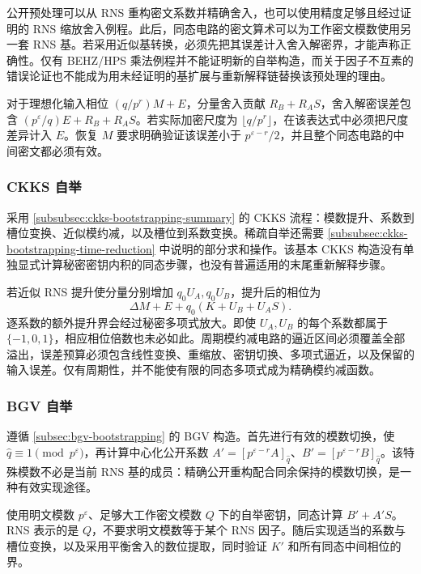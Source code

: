 公开预处理可以从 RNS 重构密文系数并精确舍入，也可以使用精度足够且经过证明的 RNS 缩放舍入例程。此后，同态电路的密文算术可以为工作密文模数使用另一套 RNS 基。若采用近似基转换，必须先把其误差计入舍入解密界，才能声称正确性。仅有 BEHZ/HPS 乘法例程并不能证明新的自举构造，而关于因子不互素的错误论证也不能成为用未经证明的基扩展与重新解释链替换该预处理的理由。

对于理想化输入相位 $(q/p^r)M+E$，分量舍入贡献 $R_B+R_AS$，舍入解密误差包含 $(p^\varepsilon/q)E+R_B+R_AS$。若实际加密尺度为 $\lfloor q/p^r\rfloor$，在该表达式中必须把尺度差异计入 $E$。恢复 $M$ 要求明确验证该误差小于 $p^{\varepsilon-r}/2$，并且整个同态电路的中间密文都必须有效。

\subsubsection{CKKS 自举}
\label{subsubsec:rns-ckks-bootstrapping}

采用 \autoref{subsubsec:ckks-bootstrapping-summary} 的 CKKS 流程：模数提升、系数到槽位变换、近似模约减，以及槽位到系数变换。稀疏自举还需要 \autoref{subsubsec:ckks-bootstrapping-time-reduction} 中说明的部分求和操作。该基本 CKKS 构造没有单独显式计算秘密密钥内积的同态步骤，也没有普遍适用的末尾重新解释步骤。

若近似 RNS 提升使分量分别增加 $q_0U_A,q_0U_B$，提升后的相位为
\[
\Delta M+E+q_0(K+U_B+U_AS).
\]
逐系数的额外提升界会经过秘密多项式放大。即使 $U_A,U_B$ 的每个系数都属于 $\{-1,0,1\}$，相应相位倍数也未必如此。周期模约减电路的逼近区间必须覆盖全部溢出，误差预算必须包含线性变换、重缩放、密钥切换、多项式逼近，以及保留的输入误差。仅有周期性，并不能使有限的同态多项式成为精确模约减函数。


\subsubsection{BGV 自举}
\label{subsubsec:rns-bgv-bootstrapping}

遵循 \autoref{subsec:bgv-bootstrapping} 的 BGV 构造。首先进行有效的模数切换，使 $\hat q\equiv1\pmod{p^\varepsilon}$，再计算中心化公开系数 $A'=[p^{\varepsilon-r}A]_{\hat q}$、$B'=[p^{\varepsilon-r}B]_{\hat q}$。该特殊模数不必是当前 RNS 基的成员：精确公开重构配合同余保持的模数切换，是一种有效实现途径。

使用明文模数 $p^\varepsilon$、足够大工作密文模数 $Q$ 下的自举密钥，同态计算 $B'+A'S$。RNS 表示的是 $Q$，不要求明文模数等于某个 RNS 因子。随后实现适当的系数与槽位变换，以及采用平衡舍入的数位提取，同时验证 $K'$ 和所有同态中间相位的界。

